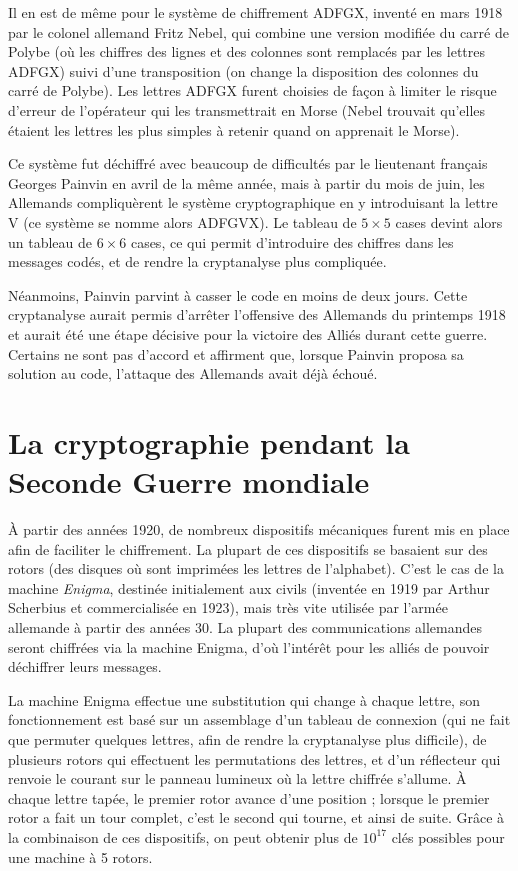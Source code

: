 Il en est de même pour le système de chiffrement ADFGX, inventé en
mars 1918 par le colonel allemand Fritz %
Nebel, qui combine une version modifiée
du carré de Polybe (où les chiffres des
lignes et des colonnes sont remplacés par les lettres ADFGX) suivi d'une
transposition (on change la disposition
des colonnes du carré de Polybe). Les lettres ADFGX furent choisies de
façon à limiter le risque d'erreur de l'opérateur qui les
transmettrait en Morse (Nebel trouvait qu'elles étaient les lettres
les plus simples à retenir quand on apprenait le Morse).

Ce système fut déchiffré avec beaucoup de difficultés par le
lieutenant français Georges Painvin en avril de la même année, mais à
partir du mois de juin, les Allemands compliquèrent le système
cryptographique en y introduisant la lettre V (ce système se nomme
alors ADFGVX). Le tableau de $5\times 5$ cases devint alors un tableau
de $6\times 6$ cases, ce qui permit d'introduire des chiffres dans
les messages codés, et de rendre la cryptanalyse plus
compliquée.

Néanmoins, Painvin parvint à casser le code en moins de
deux jours. Cette cryptanalyse aurait permis d'arrêter l'offensive
des Allemands du printemps 1918 et aurait été une étape décisive pour
la victoire des Alliés durant cette guerre. Certains
ne sont pas d'accord et affirment que, lorsque Painvin proposa
sa solution au code, l'attaque des Allemands avait déjà échoué. 
\section{La cryptographie pendant la Seconde Guerre mondiale}
À partir des années 1920, de nombreux dispositifs mécaniques
furent mis
en place afin de faciliter le chiffrement. La plupart de ces
dispositifs se basaient sur des rotors (des disques où sont imprimées
les lettres de l'alphabet). C'est le cas de la machine \emph{Enigma},
destinée initialement aux civils (inventée en 1919 par Arthur
Scherbius et commercialisée en 1923), mais très vite utilisée par
l'armée allemande à partir des années 30. La plupart des
communications allemandes seront chiffrées via la machine Enigma, d'où
l'intérêt pour les alliés de pouvoir déchiffrer leurs messages.

La machine Enigma effectue une substitution qui change à chaque
lettre, son fonctionnement est basé sur un assemblage d'un tableau de
connexion (qui ne fait que permuter quelques lettres, afin de rendre
la cryptanalyse plus difficile), de plusieurs rotors qui effectuent
les permutations des lettres, et d'un réflecteur qui renvoie le courant
sur le panneau lumineux où la lettre chiffrée s'allume. À chaque
lettre tapée, le premier rotor avance d'une position ; lorsque le
premier rotor a fait un tour complet, c'est le second qui tourne, et
ainsi de suite. Grâce à la combinaison de ces dispositifs, on peut
obtenir plus de $10^{17}$ clés possibles pour une machine à 5 rotors.


